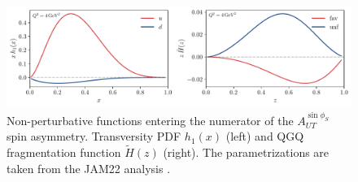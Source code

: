\begin{figure}[h]
    \centering
    \includegraphics[width=0.99\linewidth]{fig/h1Ht.pdf}
    \caption{Non-perturbative functions entering the numerator of the $A_{UT}^{\sin\phi_S}$ spin asymmetry. Transversity PDF $h_1(x)$ (left) and QGQ fragmentation function $\tilde{H}(z)$ (right). The parametrizations are taken from the JAM22 analysis \cite{Gamberg2022Htilde}.}
    \label{fig:h1Ht}
\end{figure}

